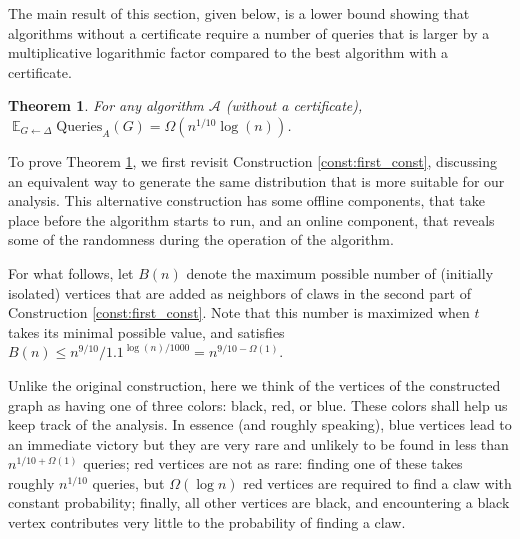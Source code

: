 \documentclass[11pt]{article}
\numberwithin{equation}{section}
\newtheorem{theorem}{Theorem}[section]
\newcommand\E{\mathop{\mathbb E}}
\newcommand{\Query}{\text{Queries}}
\newcommand{\1}{\mathbf{1}}
\newcommand{\A}{\mathcal A}
\begin{document}
The main result of this section, given below, is a lower bound showing that algorithms without a certificate require a number of queries that is larger by a multiplicative logarithmic factor compared to the best algorithm with a certificate.

\begin{theorem}
\label{thm:lower_bound_claw_no_cert}
For any algorithm $\A$ (without a certificate), $ \E_{G \leftarrow \Delta}\Query_A(G) = \Omega(n^{1/10} \log(n))$. \end{theorem}

To prove Theorem \ref{thm:lower_bound_claw_no_cert}, we first revisit Construction \ref{const:first_const}, discussing an equivalent way to generate the same distribution that is more suitable for our analysis. This alternative construction has some offline components, that take place before the algorithm starts to run, and an online component, that reveals some of the randomness during the operation of the algorithm.

For what follows, let $B(n)$ denote the maximum possible number of (initially isolated) vertices that are added as neighbors of claws in the second part of Construction \ref{const:first_const}. Note that this number is maximized when $t$ takes its minimal possible value, and satisfies $B(n) \leq n^{9/10} / 1.1^{\log (n) / 1000} = n^{9/10 - \Omega(1)}$.

Unlike the original construction, here we think of the vertices of the constructed graph as having one of three colors: black, red, or blue. These colors shall help us keep track of the analysis. In essence (and roughly speaking), blue vertices lead to an immediate victory but they are very rare and unlikely to be found in less than $n^{1/10 + \Omega(1)}$ queries; red vertices are not as rare: finding one of these takes roughly $n^{1/10}$ queries, but $\Omega(\log n)$ red vertices are required to find a claw with constant probability; finally, all other vertices are black, and encountering a black vertex contributes very little to the probability of finding a claw.
\end{document}
